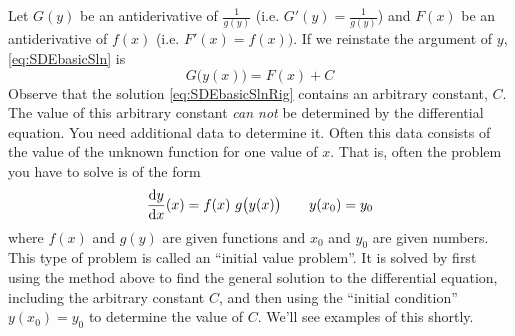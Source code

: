 
Let $G(y)$ be an antiderivative of $\frac{1}{g(y)}$ 
(i.e. $G'(y)=\frac{1}{g(y)}$) and $F(x)$ be an antiderivative of $f(x)$ 
(i.e. $F'(x)=f(x))$. If we reinstate the argument of $y$, 
\eqref{eq:SDEbasicSln} is
\begin{equation}\label{eq:SDEbasicSlnRig}
G\big(y(x)\big) = F(x) + C
\end{equation}
Observe that the solution \eqref{eq:SDEbasicSlnRig} contains an arbitrary
constant, $C$. The value of this arbitrary constant \emph{can not}
be determined by the differential equation. You need additional data
to determine it. Often this data consists of the value of the unknown
function for one value of $x$. That is, often the problem you have to solve
is of the form
\begin{equation*}
\diff{y}{x}(x) = f(x)\ g\big(y(x)\big)\qquad y(x_0)=y_0
\end{equation*}
where $f(x)$ and $g(y)$ are given functions and $x_0$ and $y_0$ are
given numbers. This type of problem is called an ``initial value problem''.
It is solved by first using the method above to find the general solution
to the differential equation, including the arbitrary constant $C$,
and then using the ``initial condition'' $y(x_0)=y_0$ to determine the
value of $C$. We'll see examples of this shortly.

